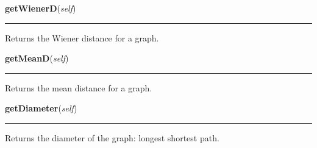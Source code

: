     \label{Epigrass:simobj:graph:getWienerD}

    \vspace{0.5ex}

    \begin{boxedminipage}{\textwidth}

    \raggedright \textbf{getWienerD}(\textit{self})

    \vspace{-1.5ex}

    \rule{\textwidth}{0.5\fboxrule}
    Returns the Wiener distance for a graph.

    \vspace{1ex}

    \end{boxedminipage}

    \label{Epigrass:simobj:graph:getMeanD}

    \vspace{0.5ex}

    \begin{boxedminipage}{\textwidth}

    \raggedright \textbf{getMeanD}(\textit{self})

    \vspace{-1.5ex}

    \rule{\textwidth}{0.5\fboxrule}
    Returns the mean distance for a graph.

    \vspace{1ex}

    \end{boxedminipage}

    \label{Epigrass:simobj:graph:getDiameter}

    \vspace{0.5ex}

    \begin{boxedminipage}{\textwidth}

    \raggedright \textbf{getDiameter}(\textit{self})

    \vspace{-1.5ex}

    \rule{\textwidth}{0.5\fboxrule}
    Returns the diameter of the graph: longest shortest path.

    \vspace{1ex}

    \end{boxedminipage}

